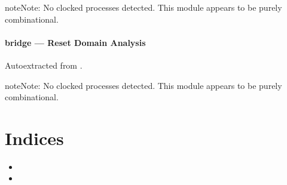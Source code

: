\documentclass[letterpaper,10pt,english]{sphinxmanual}
\begin{document}
\begin{sphinxadmonition}{note}{Note:}
\sphinxAtStartPar
No clocked processes detected. This module appears to be purely combinational.
\end{sphinxadmonition}

\sphinxstepscope


\subsubsection{bridge — Reset Domain Analysis}
\label{\detokenize{modules/bridge/reset:bridge-reset-domain-analysis}}\label{\detokenize{modules/bridge/reset::doc}}
\sphinxAtStartPar
Auto\sphinxhyphen{}extracted from .

\begin{sphinxadmonition}{note}{Note:}
\sphinxAtStartPar
No clocked processes detected. This module appears to be purely combinational.
\end{sphinxadmonition}


\chapter{Indices}
\label{\detokenize{index:indices}}\begin{itemize}
\item {} 
\sphinxAtStartPar
{}

\item {} 
\sphinxAtStartPar
{}

\end{itemize}



\renewcommand{\indexname}{Index}
\end{document}

